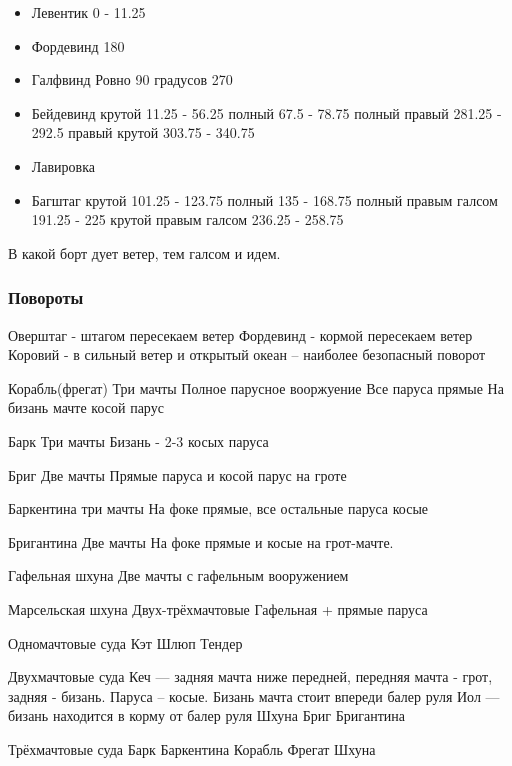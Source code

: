 \documentclass{article}        %
\begin{document}
\begin{description}
\begin{itemize}
\item Левентик
	0 - 11.25 
\item Фордевинд
	180 
\item Галфвинд
	Ровно 90 градусов
	270
\item Бейдевинд
	крутой 11.25 - 56.25
	полный 67.5 - 78.75
	полный правый 281.25 - 292.5
	правый крутой 303.75 - 340.75
\item Лавировка
\item Багштаг
	крутой 101.25 - 123.75
	полный 135 - 168.75
	полный правым галсом 191.25 - 225
	крутой правым галсом 236.25 - 258.75
\end{itemize}

В какой борт дует ветер, тем галсом и идем.

\subsubsection{Повороты}
Оверштаг - штагом пересекаем ветер
Фордевинд - кормой пересекаем ветер
Коровий - в сильный ветер и открытый океан -- наиболее безопасный поворот

Корабль(фрегат)
Три мачты
Полное парусное вооржуение
Все паруса прямые
На бизань мачте косой парус

Барк
Три мачты
Бизань - 2-3 косых паруса

Бриг 
Две мачты
Прямые паруса и косой парус на гроте

Баркентина
три мачты
На фоке прямые, все остальные паруса косые

Бригантина
Две мачты
На фоке прямые и косые на грот-мачте.

Гафельная шхуна
Две мачты с гафельным вооружением

Марсельская шхуна
Двух-трёхмачтовые
Гафельная + прямые паруса



Одномачтовые суда
Кэт
Шлюп
Тендер

Двухмачтовые суда
Кеч --- задняя мачта ниже передней, передняя мачта - грот, задняя - бизань. Паруса -- косые. Бизань мачта стоит впереди балер руля
Иол --- бизань находится в корму от балер руля 
Шхуна
Бриг
Бригантина

Трёхмачтовые суда
Барк
Баркентина
Корабль
Фрегат
Шхуна


\end{description}
\end{document}
